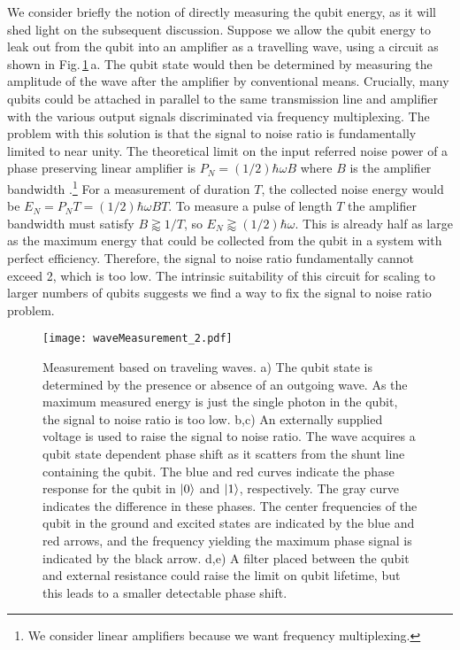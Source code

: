We consider briefly the notion of directly measuring the qubit energy, as it will shed light on the subsequent discussion.
Suppose we allow the qubit energy to leak out from the qubit into an amplifier as a travelling wave, using a circuit as shown in Fig.\,\ref{Fig:waveMeasurement}\,a.
The qubit state would then be determined by measuring the amplitude of the wave after the amplifier by conventional means.
Crucially, many qubits could be attached in parallel to the same transmission line and amplifier with the various output signals discriminated via frequency multiplexing.
The problem with this solution is that the signal to noise ratio is fundamentally limited to near unity.
The theoretical limit on the input referred noise power of a phase preserving linear amplifier is $P_N = (1/2)\hbar \omega B$ where $B$ is the amplifier bandwidth \cite{Caves:amplifiers1982}.\footnote{We consider linear amplifiers because we want frequency multiplexing.}
For a measurement of duration $T$, the collected noise energy would be $E_N = P_N T = (1/2)\hbar \omega B T$.
To measure a pulse of length $T$ the amplifier bandwidth must satisfy $B \gtrapprox 1/T$, so $E_N \gtrapprox (1/2) \hbar \omega$.
This is already half as large as the maximum energy that could be collected from the qubit in a system with perfect efficiency.
Therefore, the signal to noise ratio fundamentally cannot exceed 2, which is too low.
The intrinsic suitability of this circuit for scaling to larger numbers of qubits suggests we find a way to fix the signal to noise ratio problem.

\begin{figure}
\begin{centering}
\texttt{[image: waveMeasurement\_2.pdf]} 
\par\end{centering}
\caption{Measurement based on traveling waves. a) The qubit state is determined by the presence or absence of an outgoing wave. As the maximum measured energy is just the single photon in the qubit, the signal to noise ratio is too low. b,c) An externally supplied voltage is used to raise the signal to noise ratio. The wave acquires a qubit state dependent phase shift as it scatters from the shunt line containing the qubit. The blue and red curves indicate the phase response for the qubit in $|0\rangle$ and $|1\rangle$, respectively. The gray curve indicates the difference in these phases. The center frequencies of the qubit in the ground and excited states are indicated by the blue and red arrows, and the frequency yielding the maximum phase signal is indicated by the black arrow. d,e) A filter placed between the qubit and external resistance could raise the limit on qubit lifetime, but this leads to a smaller detectable phase shift.}
\label{Fig:waveMeasurement}
\end{figure}

